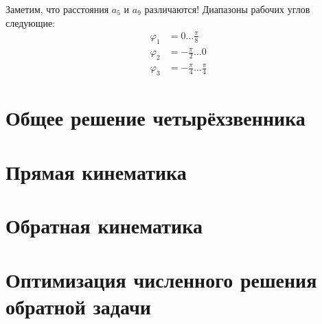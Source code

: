 Заметим, что расстояния $ a_5 $ и $ a_9 $ различаются! Диапазоны рабочих углов следующие:
\begin{align*}
    \varphi_1&=0 \dots \frac \pi 8 \\
    \varphi_2&=-\frac \pi 2 \dots 0 \\
    \varphi_3&=-\frac \pi 4 \dots \frac \pi 4
\end{align*}


\section{Общее решение четырёхзвенника}


\section{Прямая кинематика}


\section{Обратная кинематика}


\section{Оптимизация численного решения обратной задачи}